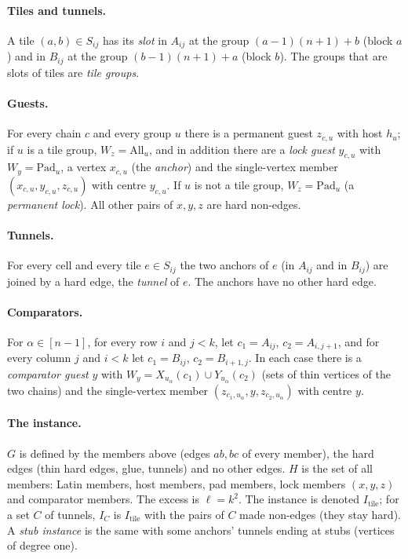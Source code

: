 \paragraph{Tiles and tunnels.} A tile $(a,b)\in S_{ij}$ has its \emph{slot} in $A_{ij}$ at the group $(a-1)(n+1)+b$ (block $a$) and in $B_{ij}$ at the group $(b-1)(n+1)+a$ (block $b$). The groups that are slots of tiles are \emph{tile groups}.

\paragraph{Guests.} For every chain $c$ and every group $u$ there is a permanent guest $z_{c,u}$ with host $h_u$; if $u$ is a tile group, $W_z=\mathrm{All}_u$, and in addition there are a \emph{lock guest} $y_{c,u}$ with $W_y=\mathrm{Pad}_u$, a vertex $x_{c,u}$ (the \emph{anchor}) and the single-vertex member $(x_{c,u},y_{c,u},z_{c,u})$ with centre $y_{c,u}$. If $u$ is not a tile group, $W_z=\mathrm{Pad}_u$ (a \emph{permanent lock}). All other pairs of $x,y,z$ are hard non-edges.

\paragraph{Tunnels.} For every cell and every tile $e\in S_{ij}$ the two anchors of $e$ (in $A_{ij}$ and in $B_{ij}$) are joined by a hard edge, the \emph{tunnel} of $e$. The anchors have no other hard edge.

\paragraph{Comparators.} For $\alpha\in[n-1]$, for every row $i$ and $j<k$, let $c_1=A_{ij}$, $c_2=A_{i,j+1}$, and for every column $j$ and $i<k$ let $c_1=B_{ij}$, $c_2=B_{i+1,j}$. In each case there is a \emph{comparator guest} $y$ with $W_y=X_{u_\alpha}(c_1)\cup Y_{u_\alpha}(c_2)$ (sets of thin vertices of the two chains) and the single-vertex member $(z_{c_1,u_\alpha},y,z_{c_2,u_\alpha})$ with centre $y$.

\paragraph{The instance.} $G$ is defined by the members above (edges $ab,bc$ of every member), the hard edges (thin hard edges, glue, tunnels) and no other edges. $H$ is the set of all members: Latin members, host members, pad members, lock members $(x,y,z)$ and comparator members. The excess is $\ell=k^2$. The instance is denoted $I_{\mathrm{tile}}$; for a set $C$ of tunnels, $I_C$ is $I_{\mathrm{tile}}$ with the pairs of $C$ made non-edges (they stay hard). A \emph{stub instance} is the same with some anchors' tunnels ending at stubs (vertices of degree one).

